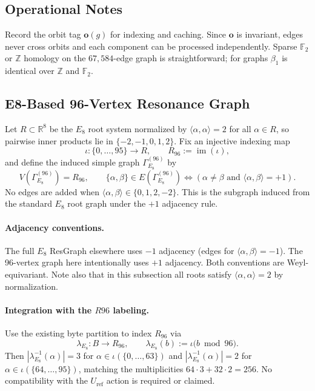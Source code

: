 \documentclass[12pt]{article}
\begin{document}
\subsection{Operational Notes}
Record the orbit tag $\mathbf o(g)$ for indexing and caching. Since $\mathbf o$ is invariant, edges never cross orbits and each component can be processed independently. Sparse $\mathbb F_2$ or $\mathbb Z$ homology on the $67{,}584$-edge graph is straightforward; for graphs $\beta_1$ is identical over $\mathbb Z$ and $\mathbb F_2$.

\subsection{E8-Based 96-Vertex Resonance Graph}
Let $R\subset\mathbb R^8$ be the $E_8$ root system normalized by $\langle\alpha,\alpha\rangle=2$ for all $\alpha\in R$, so pairwise inner products lie in $\{-2,-1,0,1,2\}$. Fix an injective indexing map
\[
\iota:\{0,\dots,95\}\longrightarrow R,\qquad R_{96}:=\operatorname{im}(\iota),
\]
and define the induced simple graph $\Gamma_{E_8}^{(96)}$ by
\[
V(\Gamma_{E_8}^{(96)})=R_{96},\qquad \{\alpha,\beta\}\in E(\Gamma_{E_8}^{(96)})\iff (\alpha\neq\beta\text{ and }\langle\alpha,\beta\rangle=+1).
\]
No edges are added when $\langle\alpha,\beta\rangle\in\{0,1,2,-2\}$. This is the subgraph induced from the standard $E_8$ root graph under the $+1$ adjacency rule.

\paragraph{Adjacency conventions.} The full $E_8$ ResGraph elsewhere uses $-1$ adjacency (edges for $\langle\alpha,\beta\rangle=-1$). The 96-vertex graph here intentionally uses $+1$ adjacency. Both conventions are Weyl-equivariant. Note also that in this subsection all roots satisfy $\langle\alpha,\alpha\rangle=2$ by normalization.

\paragraph{Integration with the $R96$ labeling.} Use the existing byte partition to index $R_{96}$ via
\[
\lambda_{E_8}:B\to R_{96},\qquad \lambda_{E_8}(b):=\iota\big(b\bmod 96\big).
\]
Then $|\lambda_{E_8}^{-1}(\alpha)|=3$ for $\alpha\in\iota(\{0,\dots,63\})$ and $|\lambda_{E_8}^{-1}(\alpha)|=2$ for $\alpha\in\iota(\{64,\dots,95\})$, matching the multiplicities $64\cdot3+32\cdot2=256$. No compatibility with the $U_{\mathrm{ref}}$ action is required or claimed.
\end{document}

